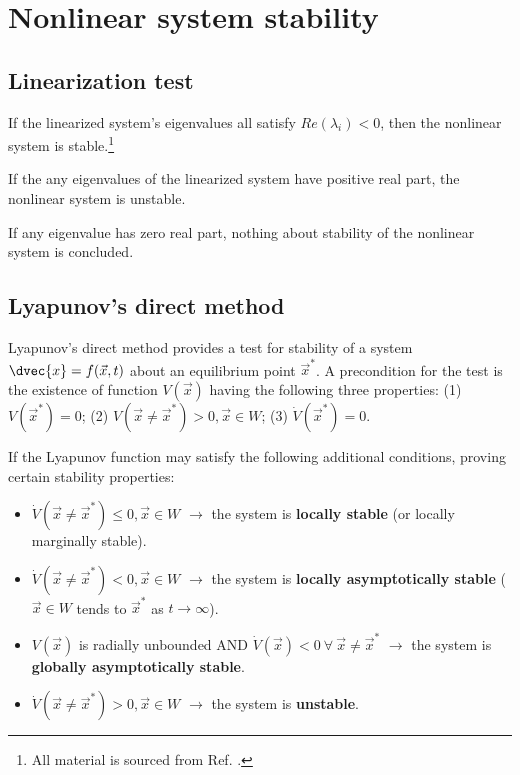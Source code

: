 
\chapter{Nonlinear system stability}

\section{Linearization test}

If the linearized system's eigenvalues all satisfy $Re(\lambda_i) < 0$, then the nonlinear system is stable.\footnote{ All material is sourced from Ref. \cite{hurtado2015}.}

If the any eigenvalues of the linearized system have positive real part, the nonlinear system is unstable.

If any eigenvalue has zero real part, nothing about stability of the nonlinear system is concluded.

\section{Lyapunov's direct method}

Lyapunov's direct method provides a test for stability of a system $\dvec{x} = f(\vec{x},t)$ about an equilibrium point $\vec{x}^*$. A precondition for the test is the existence of function $V(\vec{x})$ having the following three properties: (1) $V(\vec{x}^*) = 0$; (2) $V(\vec{x}\neq \vec{x}^*) > 0, \vec{x}\in W$; (3) $\dot{V}(\vec{x}^*) = 0$.

If the Lyapunov function may satisfy the following additional conditions, proving certain stability properties:

\begin{itemize}
	\item $\dot{V}(\vec{x}\neq\vec{x}^*) \leq 0, \vec{x}\in W$ $\rightarrow$ the system is \textbf{locally stable} (or locally marginally stable).
	\item $\dot{V}(\vec{x}\neq\vec{x}^*) < 0, \vec{x}\in W$ $\rightarrow$ the system is \textbf{locally asymptotically stable} ($\vec{x} \in W$ tends to $\vec{x}^*$ as $t\rightarrow\infty$).
	\item $V(\vec{x})$ is radially unbounded AND $\dot{V}(\vec{x}) < 0 \ \forall \ \vec{x}\neq\vec{x}^*$ $\rightarrow$ the system is \textbf{globally asymptotically stable}.
	\item $\dot{V}(\vec{x}\neq\vec{x}^*) > 0, \vec{x}\in W$ $\rightarrow$ the system is \textbf{unstable}.
\end{itemize}

